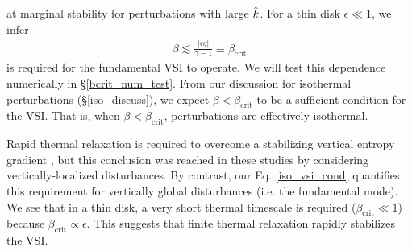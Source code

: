 at marginal stability for perturbations with large $\hat{k}$. 
For a thin disk $\epsilon\ll 1$, we infer 
\begin{align}\label{iso_vsi_cond}
  \beta \lesssim \frac{|\epsilon q|}{\gamma-1} \equiv
  \beta_\mathrm{crit} 
\end{align}
is required for the fundamental VSI to operate. We will test this
dependence numerically in \S\ref{bcrit_num_test}. 
From our discussion for isothermal perturbations
(\S\ref{iso_discuss}), we expect   
$\beta<\beta_\mathrm{crit}$ to be a sufficient condition for the
VSI. That is, when $\beta<\beta_\mathrm{crit}$, perturbations are
effectively isothermal. 

Rapid thermal relaxation is required to overcome a stabilizing
vertical entropy gradient \citep{goldreich67,urpin98,urpin03}, but
this conclusion was reached in these studies by considering
vertically-localized disturbances. %
By contrast, our Eq. \ref{iso_vsi_cond} quantifies this requirement
for vertically global disturbances (i.e. the fundamental mode). We see
that in a thin disk, a very short thermal timescale
 is required ($\beta_\mathrm{crit}\ll 1$) because
$\beta_\mathrm{crit}\propto \epsilon$. 
This suggests that
finite thermal relaxation rapidly stabilizes the VSI.  











